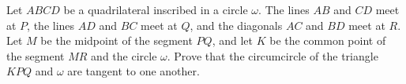 Let $ABCD$ be a quadrilateral inscribed in a circle $\omega$. The lines $AB$ and $CD$ meet at $P$, the lines $AD$ and $BC$ meet at $Q$, and the diagonals $AC$ and $BD$ meet at $R$. Let $M$ be the midpoint of the segment $PQ$, and let $K$ be the common point of the segment $MR$ and the circle $\omega$. Prove that the circumcircle of the triangle $KPQ$ and $\omega$ are tangent to one another.
